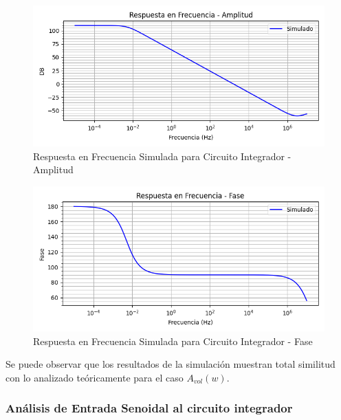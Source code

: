 \begin{figure}[H]
    \centering 
    \includegraphics [scale=1] {../Ejercicio3-CircuitoIntegradoresyDerivadores/Imagenes/simulado-integrador-amplitud.png} 
    \caption{Respuesta en Frecuencia Simulada para Circuito Integrador - Amplitud }
    \label{fig:emptyPlotTool}
\end{figure}

\begin{figure}[H]
    \centering 
    \includegraphics [scale=1] {../Ejercicio3-CircuitoIntegradoresyDerivadores/Imagenes/simulado-integrador-fase.png} 
    \caption{Respuesta en Frecuencia Simulada para Circuito Integrador - Fase }
    \label{fig:emptyPlotTool}
\end{figure}

Se puede observar que los resultados de la simulación muestran total similitud con lo analizado teóricamente para el caso $A_{vol}(w)$.

\subsubsection{Análisis de Entrada Senoidal al circuito integrador}

